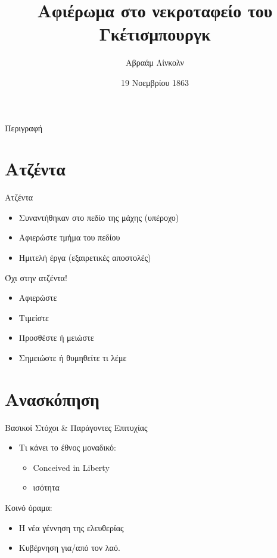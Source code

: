 \documentclass{beamer}
\title{Αφιέρωμα στο νεκροταφείο του Γκέτισμπουργκ}
\author{Αβραάμ Λίνκολν}
\institute{Ηνωμένες Πολιτείες Αμερικής}
\date{19 Νοεμβρίου 1863}
\begin{document}
\begin{frame}
  \titlepage
\end{frame}

\begin{frame}{Περιγραφή}
  \tableofcontents
\end{frame}

\section{Ατζέντα}

\begin{frame}{Ατζέντα}

\begin{itemize}
  \item  Συναντήθηκαν στο πεδίο της μάχης (υπέροχο)
  \item Αφιερώστε τμήμα του πεδίου
  \item Ημιτελή έργα (εξαιρετικές αποστολές)
\end{itemize}

\end{frame}

\begin{frame}{Όχι στην ατζέντα!}

\begin{itemize}[<+->]
  \item Αφιερώστε
  \item Τιμείστε 
  \item Προσθέστε ή μειώστε
  \item Σημειώστε ή θυμηθείτε τι λέμε
\end{itemize}

\end{frame}

\section{Ανασκόπηση}

\begin{frame}{Βασικοί Στόχοι \& Παράγοντες Επιτυχίας}

\begin{itemize}
\item Τι κάνει το έθνος μοναδικό:
  \begin{itemize}
    \item \textlatin{Conceived in Liberty}
    \item ισότητα
  \end{itemize}
\end{itemize}

\begin{block}{Κοινό όραμα:}
\begin{itemize}
\item Η νέα γέννηση της ελευθερίας
\item Κυβέρνηση για/από τον λαό.
\end{itemize}
\end{block}

\end{frame}
\end{document}
